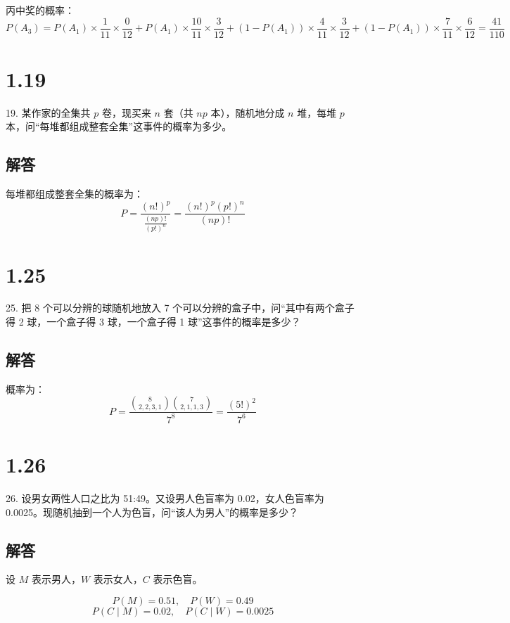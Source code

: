 \documentclass[UTF8]{report}
\theoremstyle{MyLineTheoremStyle} %
\theoremstyle{MyBlockTheoremStyle} %
\theoremstyle{MySubsubsectionStyle} %
\begin{document}
丙中奖的概率：
\[
P(A_3) = P(A_1) \times \frac{1}{11} \times \frac{0}{12} + P(A_1) \times \frac{10}{11} \times \frac{3}{12} + (1 - P(A_1)) \times \frac{4}{11} \times \frac{3}{12} + (1 - P(A_1)) \times \frac{7}{11} \times \frac{6}{12} = \frac{41}{110}
\]

\section{1.19}

19. 某作家的全集共 \(p\) 卷，现买来 \(n\) 套（共 \(np\) 本），随机地分成 \(n\) 堆，每堆 \(p\) 本，问“每堆都组成整套全集”这事件的概率为多少。

\subsection*{解答}

每堆都组成整套全集的概率为：
\[
P = \frac{(n!)^p}{\frac{(np)!}{(p!)^n}} = \frac{(n!)^p(p!)^n}{(np)!} 
\]

\section{1.25}

25. 把 8 个可以分辨的球随机地放入 7 个可以分辨的盒子中，问“其中有两个盒子得 2 球，一个盒子得 3 球，一个盒子得 1 球”这事件的概率是多少？

\subsection*{解答}

概率为：
\[
P = \frac{\binom{8}{2, 2, 3, 1}\binom{7}{2, 1, 1, 3}}{7^8} = \frac{(5!)^2}{7^6}
\]

\section{1.26}

26. 设男女两性人口之比为 51:49。又设男人色盲率为 0.02，女人色盲率为 0.0025。现随机抽到一个人为色盲，问“该人为男人”的概率是多少？

\subsection*{解答}

设 \(M\) 表示男人，\(W\) 表示女人，\(C\) 表示色盲。

\[
P(M) = 0.51, \quad P(W) = 0.49
\]
\[
P(C \mid M) = 0.02, \quad P(C \mid W) = 0.0025
\]
\end{document}
